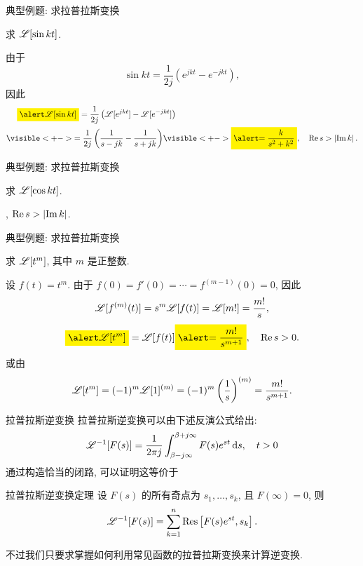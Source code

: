 \begin{frame}{典型例题: 求拉普拉斯变换}
\begin{example}
求 $\mathscr{L}[\sin{kt}]$.
\end{example}
\begin{solution}
由于
\[\sin{kt}=\frac1{2j}(e^{jkt}-e^{-jkt}),\]
\onslide<+->
因此
\begin{align*}
&\peq\aboxeq{\msl[\sin{kt}]}=\frac1{2j}\left(\msl[e^{jkt}]-\msl[e^{-jkt}]\right)\\
&\visible<+->{=\frac1{2j}\left(\frac1{s-jk}-\frac1{s+jk}\right)}
\visible<+->{\aboxeq{=\frac k{s^2+k^2}},\quad \Re s>\abs{\Im k}.}
\end{align*}
\end{solution}
\end{frame}


\begin{frame}{典型例题: 求拉普拉斯变换}
\begin{exercise}
求 $\mathscr{L}[\cos{kt}]$.
\end{exercise}
\begin{answer}
, $\operatorname{Re} s>\left|\operatorname{Im} k\right|$.
\end{answer}
\end{frame}


\begin{frame}{典型例题: 求拉普拉斯变换}
\begin{example}
求 $\mathscr{L}[t^m]$, 其中 $m$ 是正整数.
\end{example}
\begin{solution}
设 $f(t)=t^m$. 由于 $f(0)=f'(0)=\cdots=f^{(m-1)}(0)=0$,
\onslide<+->
因此
\[\mathscr{L}[f^{(m)}(t)]=s^m\mathscr{L}[f(t)]=\mathscr{L}[m!]=\frac{m!}s,\]
\onslide<+->
\vspace{-\baselineskip}
\[\aboxeq{\msl[t^m]}=\msl[f(t)]\aboxeq{=\frac{m!}{s^{m+1}}},\quad \Re s>0.\]
\onslide<+->
或由
\vspace{-\baselineskip}
\[\mathscr{L}[t^m]=(-1)^m \mathscr{L}[1]^{(m)}
=(-1)^m\left(\frac1s\right)^{(m)}=\frac{m!}{s^{m+1}}.\]
\vspace{-\baselineskip}
\end{solution}
\end{frame}


\begin{frame}{拉普拉斯逆变换}
\onslide<+->
拉普拉斯逆变换可以由下述反演公式给出:
\[\mathscr{L}^{-1}[F(s)]=\frac1{2\pi j}\int_{\beta-j\infty}^{\beta+j\infty}F(s)e^{st}\,\mathrm{d} s,\quad t>0\]
\onslide<+->
通过构造恰当的闭路, 可以证明这等价于
\begin{block}{拉普拉斯逆变换定理}
设 $F(s)$ 的所有奇点为 $s_1,\dots,s_k$, 且 $F(\infty)=0$, 则
\[\mathscr{L}^{-1}[F(s)]=\sum_{k=1}^n {\mathrm{Res}}\left[F(s)e^{st},s_k\right].\]
\end{block}
\onslide<+->
不过我们只要求掌握如何利用常见函数的拉普拉斯变换来计算逆变换.
\end{frame}


